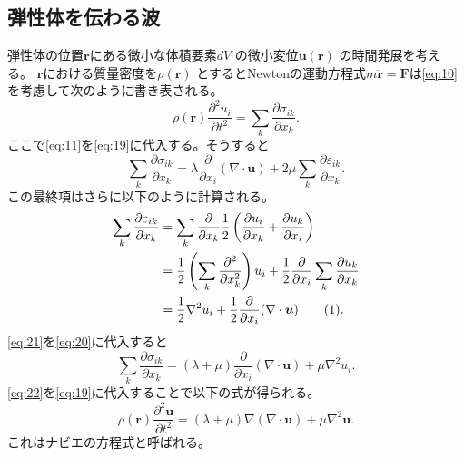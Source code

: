 \documentclass[dvipdfmx,11pt]{jsreport}
\numberwithin{equation}{chapter}
\numberwithin{table}{chapter}
\begin{document}
\subsection{弾性体を伝わる波}
弾性体の位置$\bm{r}$にある微小な体積要素$dV$ の微小変位$\bm{u}(\bm{r})$ の時間発展を考える。
$\bm{r}$における質量密度を$\rho(\bm{r})$ とするとNewtonの運動方程式$m \ddot{\bm{r}}=\bm{F}$は\eqref{eq:10}
を考慮して次のように書き表される。
\begin{equation}
\label{eq:19}
	\rho(\bm{r})\frac{\partial ^2 u_i}{\partial t^2} =\sum_{k}^{} \frac{\partial \sigma_{ik}}{\partial x_k} 
.\end{equation}
ここで\eqref{eq:11}を\eqref{eq:19}に代入する。そうすると
\begin{equation}
\label{eq:20}
	\sum_{k}^{} \frac{\partial \sigma_{ik}}{\partial x_k} =\lambda \frac{\partial }{\partial x_i} (\nabla \cdot \bm{u})+2\mu \sum_{k}^{} \frac{\partial \varepsilon_{ik}}{\partial x_k} 
.\end{equation}
この最終項はさらに以下のように計算される。
\begin{align*}
	\label{eq:21}
	\sum_{k}^{} \frac{\partial \varepsilon_{ik}}{\partial x_k} &= \sum_{k}^{} \frac{\partial }{\partial x_k} \frac{1}{2}\left( \frac{\partial u_i}{\partial x_k} +\frac{\partial u_k}{\partial x_i}  \right)  \\
	&= \frac{1}{2}\left( \sum_{k}^{} \frac{\partial ^2}{\partial x_k^2}  \right)u_i+\frac{1}{2}\frac{\partial }{\partial x_i} \sum_{k}^{} \frac{\partial u_k}{\partial x_k}   \\
	&= \frac{1}{2}\nabla ^2u_i+\frac{1}{2}\frac{\partial }{\partial x_i} (\nabla \cdot \bm{u}) 
	\stepcounter{equation}\tag{\theequation} 
.\end{align*}
\eqref{eq:21}を\eqref{eq:20}に代入すると
\begin{equation}
\label{eq:22}
	\sum_{k}^{} \frac{\partial \sigma_{ik}}{\partial x_k} =(\lambda+\mu)\frac{\partial }{\partial x_i} (\nabla \cdot \bm{u})+\mu \nabla ^2u_i
.\end{equation}
\eqref{eq:22}を\eqref{eq:19}に代入することで以下の式が得られる。
\begin{equation}
\label{eq:23}
	\rho(\bm{r})\frac{\partial ^2\bm{u}}{\partial t^2} =(\lambda+\mu)\nabla (\nabla \cdot \bm{u})+\mu\nabla ^2\bm{u}
.\end{equation}
これはナビエの方程式と呼ばれる。
\end{document}
